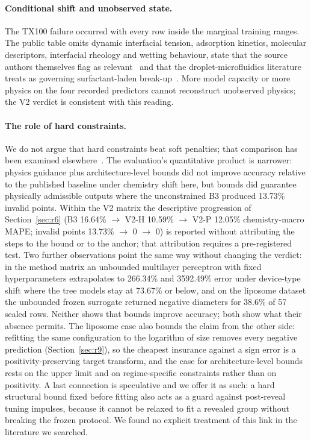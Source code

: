 \documentclass[11pt,a4paper]{article}
\newcommand{\tox}{TX100}
\begin{document}
\paragraph{Conditional shift and unobserved state.} The \tox{} failure
occurred with every row inside the marginal training ranges. The public table
omits dynamic interfacial tension, adsorption kinetics, molecular descriptors,
interfacial rheology and wetting behaviour, state that the source authors
themselves flag as relevant~\cite{chagot2022} and that the droplet-microfluidics
literature treats as governing surfactant-laden break-up~\cite{anna2016}. More
model capacity or more
physics on the four recorded predictors cannot reconstruct unobserved physics;
the V2 verdict is consistent with this reading.

\paragraph{The role of hard constraints.} We do not argue that hard
constraints beat soft penalties; that comparison has been examined
elsewhere~\cite{naturecs2021,baty2023,prnet2026}. The evaluation's quantitative
product is narrower: physics guidance plus architecture-level bounds did not
improve accuracy relative to the published baseline under chemistry shift here, but bounds did guarantee physically
admissible outputs where the unconstrained B3 produced 13.73\% invalid points.
Within the V2 matrix the descriptive progression of Section~\ref{sec:r6}
(B3 16.64\% $\to$ V2-H 10.59\% $\to$ V2-P 12.05\% chemistry-macro MAPE;
invalid points 13.73\% $\to$ 0 $\to$ 0) is reported without attributing the
steps to the bound or to the anchor; that attribution requires a
pre-registered test.
Two further observations point the same way without changing the verdict: in
the method matrix an unbounded multilayer perceptron with fixed
hyperparameters extrapolates to 266.34\% and 3592.49\% error under
device-type shift where the tree models stay at 73.67\% or below, and on the
liposome dataset the unbounded frozen surrogate returned negative diameters
for 38.6\% of 57 sealed rows. Neither shows that bounds improve accuracy; both
show what their absence permits. The liposome case also bounds the claim
from the other side: refitting the same configuration to the logarithm of
size removes every negative prediction (Section~\ref{sec:r9}), so the
cheapest insurance against a sign error is a positivity-preserving target
transform, and the case for architecture-level bounds rests on the upper
limit and on regime-specific constraints rather than on positivity. A last
connection is speculative and we offer it as such: a hard
structural bound fixed before fitting also acts as a guard against post-reveal
tuning impulses, because it cannot be relaxed to fit a revealed group without
breaking the frozen protocol. We found no explicit treatment of this link in
the literature we searched.
\end{document}
